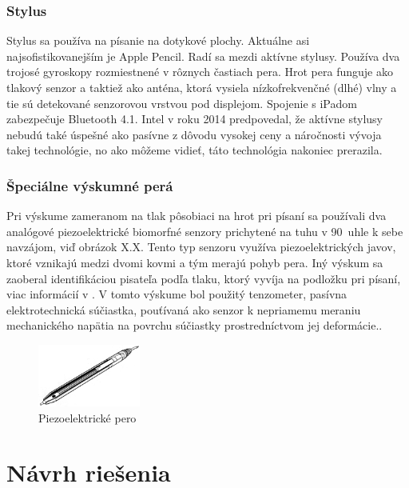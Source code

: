\subsection*{Stylus}

Stylus sa používa na písanie na dotykové plochy. Aktuálne asi najsofistikovanejším je Apple Pencil. Radí sa mezdi aktívne stylusy\cite{HarleyJonahA2013As}. Používa dva trojosé gyroskopy rozmiestnené v rôznych častiach pera. Hrot pera funguje ako tlakový senzor a taktiež ako anténa, ktorá vysiela nízkofrekvenčné (dlhé) vlny a tie sú detekované senzorovou vrstvou pod displejom. Spojenie s iPadom zabezpečuje Bluetooth 4.1\cite{ApplePencilForum}. Intel v roku 2014 predpovedal, že aktívne stylusy nebudú také úspešné ako pasívne z dôvodu vysokej ceny a náročnosti vývoja takej technológie\cite{IntelDisp}, no ako môžeme vidieť, táto technológia nakoniec prerazila.\newline

\subsection*{Špeciálne výskumné perá}

Pri výskume zameranom na tlak pôsobiaci na hrot pri písaní sa používali dva analógové piezoelektrické biomorfné senzory prichytené na tuhu v 90\degree~uhle k sebe navzájom\cite{EernisseE}, viď obrázok X.X. Tento typ senzoru využíva piezoelektrických javov, ktoré vznikajú medzi dvomi kovmi a tým merajú pohyb pera. Iný výskum sa zaoberal identifikáciou pisateľa podľa tlaku, ktorý vyvíja na podložku pri písaní, viac informácií v \cite{SchomakerL.1990Trbp}. V tomto výskume bol použitý tenzometer, pasívna elektrotechnická súčiastka, pouťívaná ako senzor k nepriamemu meraniu mechanického napätia na povrchu súčiastky prostredníctvom jej deformácie.\cite{Tenzometr}.

\begin{figure}[hbt]
	\centering
	\includegraphics[width=0.3\textwidth]{obrazky-figures/piezoPen1997.png}
	\caption{Piezoelektrické pero}
	\label{piezoPen1997}
\end{figure}

\chapter{Návrh riešenia}

